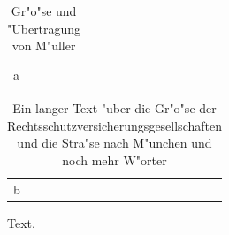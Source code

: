 \documentclass{article}
\begin{document}
\begin{table}[h]
\centering
\begin{tabular}{l}
a
\end{tabular}
\caption{Gr"o"se und "Ubertragung von M"uller}
\end{table}
\begin{table}[h]
\centering
\begin{tabular}{l}
b
\end{tabular}
\caption{Ein langer Text "uber die Gr"o"se der Rechtsschutzversicherungsgesellschaften und die Stra"se nach M"unchen und noch mehr W"orter}
\end{table}
Text.
\end{document}
